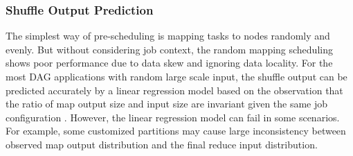 \subsubsection{Shuffle Output Prediction}\label{shuffleprediction}
{\color{black}
The simplest way of pre-scheduling is mapping tasks to nodes randomly and evenly.
But without considering job context, the random mapping scheduling shows poor performance due to data skew and ignoring data locality.
For the most DAG applications with random large scale input, 
the shuffle output can be predicted accurately by a linear regression model based on the observation that the ratio of map output size and input size are invariant given the same job configuration \cite{guo2017ishuffle}.
However, the linear regression model can fail in some scenarios. 
For example, some customized partitions may cause large inconsistency between observed map output distribution and the final reduce input distribution. 
}
